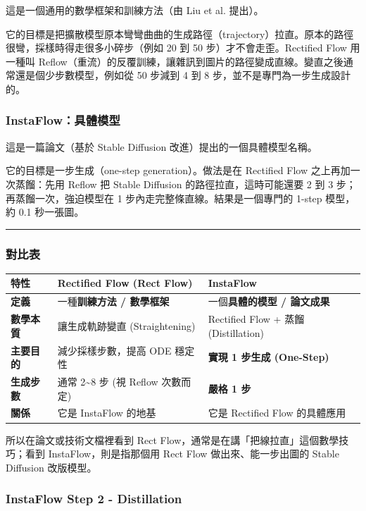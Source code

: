 這是一個通用的數學框架和訓練方法（由 Liu et al. 提出）。

它的目標是把擴散模型原本彎彎曲曲的生成路徑（trajectory）拉直。原本的路徑很彎，採樣時得走很多小碎步（例如 20 到 50 步）才不會走歪。Rectified Flow 用一種叫 Reflow（重流）的反覆訓練，讓雜訊到圖片的路徑變成直線。變直之後通常還是個少步數模型，例如從 50 步減到 4 到 8 步，並不是專門為一步生成設計的。

\subsubsection{InstaFlow：具體模型}

這是一篇論文（基於 Stable Diffusion 改進）提出的一個具體模型名稱。

它的目標是一步生成（one-step generation）。做法是在 Rectified Flow 之上再加一次蒸餾：先用 Reflow 把 Stable Diffusion 的路徑拉直，這時可能還要 2 到 3 步；再蒸餾一次，強迫模型在 1 步內走完整條直線。結果是一個專門的 1-step 模型，約 0.1 秒一張圖。

\hrule

\subsubsection{對比表}

\begin{center}
\begin{tabular}{lll}
\toprule
\textbf{特性} & \textbf{Rectified Flow (Rect Flow)} & \textbf{InstaFlow} \\
\midrule
\textbf{定義} & 一種\textbf{訓練方法 / 數學框架} & 一個\textbf{具體的模型 / 論文成果} \\
\textbf{數學本質} & 讓生成軌跡變直 (Straightening) & Rectified Flow + 蒸餾 (Distillation) \\
\textbf{主要目的} & 減少採樣步數，提高 ODE 穩定性 & \textbf{實現 1 步生成 (One-Step)} \\
\textbf{生成步數} & 通常 2\textasciitilde{}8 步 (視 Reflow 次數而定) & \textbf{嚴格 1 步} \\
\textbf{關係} & 它是 InstaFlow 的地基 & 它是 Rectified Flow 的具體應用 \\
\bottomrule
\end{tabular}
\end{center}

所以在論文或技術文檔裡看到 Rect Flow，通常是在講「把線拉直」這個數學技巧；看到 InstaFlow，則是指那個用 Rect Flow 做出來、能一步出圖的 Stable Diffusion 改版模型。

\subsubsection{InstaFlow Step 2 - Distillation}

